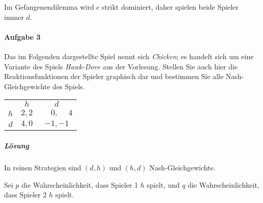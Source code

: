 \begin{center}
\end{center}
Im Gefangenendilemma wird $c$ strikt dominiert, daher spielen beide Spieler immer $d$.

\paragraph{Aufgabe 3}%
\label{par:serie_5_aufgabe_3}

Das im Folgenden dargestellte Spiel nennt sich \emph{Chicken}; es handelt sich um eine
Variante des Spiels \emph{Hawk-Dove} aus der Vorlesung.
Stellen Sie auch hier die Reaktionsfunktionen der Spieler graphisch dar und bestimmen Sie
alle Nash-Gleichgewichte des Spiels.
\begin{center}
  \begin{tabular}{ccc}
    & $h$ & $d$\\
    \cmidrule{2-3}
    $h$ & $2,2$ & $\phantom{-}0,\phantom{-}4$\\
    \cmidrule{2-3}
    $d$ & $4,0$ & $-1,-1$\\
    \cmidrule{2-3}
  \end{tabular}
\end{center}

\subparagraph{Lösung}%

In reinen Strategien sind $(d,h)$ und $(h,d)$ Nash-Gleichgewichte.

Sei $p$ die Wahrscheinlichkeit, dass Spieler 1 $h$ spielt,
und $q$ die Wahrscheinlichkeit, dass Spieler 2 $h$ spielt.

